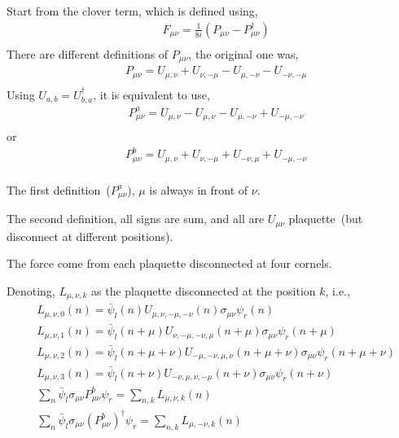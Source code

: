 Start from the clover term, which is defined using,
\begin{equation}
\begin{split}
&F_{\mu\nu}=\frac{1}{8i}\left(P_{\mu\nu}-P_{\mu\nu}^{\dagger}\right)\\
\end{split}
\end{equation}
There are different definitions of $P_{\mu\nu}$, the original one was,
\begin{equation}
\begin{split}
&P_{\mu\nu}=U_{\mu,\nu}+U_{\nu,-\mu}-U_{\mu,-\nu}-U_{-\nu,-\mu}\\
\end{split}
\end{equation}
Using $U_{a,b}=U_{b,a}^{\dagger}$, it is equivalent to use,
\begin{equation}
\begin{split}
&P^a_{\mu\nu}=U_{\mu,\nu}-U_{\mu,\nu}-U_{\mu,-\nu}+U_{-\mu,-\nu}\\
\end{split}
\end{equation}
or
\begin{equation}
\begin{split}
&P^b_{\mu\nu}=U_{\mu,\nu}+U_{\nu,-\mu}+U_{-\nu,\mu}+U_{-\mu,-\nu}\\
\end{split}
\end{equation}

The first definition~($P^a_{\mu\nu}$), $\mu$ is always in front of $\nu$.

The second definition, all signs are sum, and all are $U_{\mu\nu}$ plaquette~(but disconnect at different positions).

The force come from each plaquette disconnected at four cornels.

Denoting, $L_{\mu,\nu,k}$ as the plaquette disconnected at the position $k$, i.e.,
\begin{equation}
\begin{split}
&L_{\mu,\nu,0}(n) = \bar{\psi}_l(n) U_{\mu,\nu,-\mu,-\nu}(n) \sigma _{\mu\nu}\psi_r(n)\\
&L_{\mu,\nu,1}(n) = \bar{\psi}_l(n+\mu) U_{\nu,-\mu,-\nu,\mu}(n+\mu) \sigma _{\mu\nu}\psi_r(n+\mu)\\
&L_{\mu,\nu,2}(n) = \bar{\psi}_l(n+\mu+\nu) U_{-\mu,-\nu,\mu,\nu}(n+\mu+\nu) \sigma _{\mu\nu}\psi_r(n+\mu+\nu)\\
&L_{\mu,\nu,3}(n) = \bar{\psi}_l(n+\nu) U_{-\nu,\mu,\nu,-\mu}(n+\nu) \sigma _{\mu\nu}\psi_r(n+\nu)\\
&\sum _n \bar{\psi}_l\sigma _{\mu\nu}P^b_{\mu\nu}\psi _r = \sum _{n,k}L_{\mu,\nu,k}(n)\\
&\sum _n \bar{\psi}_l\sigma _{\mu\nu}\left(P^b_{\mu\nu}\right)^{\dagger}\psi _r = \sum _{n,k}L_{\mu,-\nu,k}(n)\\
\end{split}
\end{equation}

